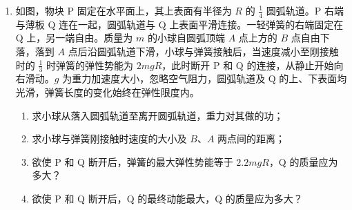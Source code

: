 \documentclass[\gkver]{gaokaozhenti}
\begin{document}
\begin{enumerate}
{$C_{2} = \alpha \frac{S}{d_{2}} = \alpha \frac{S}{\eta d_{1}}$

因为按压不改变电荷量 $Q$，所以按压后电压

$U_{2} = \frac{Q}{C_{2}} = \frac{Q \eta d_{1}}{\alpha S}$

所以有 $\frac{U_{2}}{U_{1}} = \eta$

即按压后极板间的电压变为按压前的 $\eta$ 倍。

（2）对于平行板电容器，极板间的电场强度 $E = \frac{U}{d}$；

设按压前电压为 $U$，极板间距离为 $d_{1}$，则电场强度

$E_{1} = \frac{U}{d_{1}}$

按压后极板间距离变为 $d_{2} = \eta d_{1}$，且电压不变仍为 $U$，此时电场强度

$E_{2} = \frac{U}{d_{2}} = \frac{U}{\eta d_{1}}$

所以有 $\frac{E_{2}}{E_{1}} = \frac{1}{\eta}$

按压后极板间的电场强度大小变为按压前的 $\frac{1}{\eta}$ 倍。
}

\item
如图，物块 P 固定在水平面上，其上表面有半径为 $R$ 的 $\frac{1}{4}$ 圆弧轨道。P 右端与薄板 Q 连在一起，圆弧轨道与 Q 上表面平滑连接。一轻弹簧的右端固定在 Q 上，另一端自由。质量为 $m$ 的小球自圆弧顶端 $A$ 点上方的 $B$ 点自由下落，落到 $A$ 点后沿圆弧轨道下滑，小球与弹簧接触后，当速度减小至刚接触时的 $\frac{1}{3}$ 时弹簧的弹性势能为 $2mgR$，此时断开 P 和 Q 的连接，从静止开始向右滑动。$g$ 为重力加速度大小，忽略空气阻力，圆弧轨道及 Q 的上、下表面均光滑，弹簧长度的变化始终在弹性限度内。
\begin{enumerate}
	\item
	求小球从落入圆弧轨道至离开圆弧轨道，重力对其做的功；
	\item
	求小球与弹簧刚接触时速度的大小及 $B$、$A$ 两点间的距离；
	\item
	欲使 P 和 Q 断开后，弹簧的最大弹性势能等于 $2.2mgR$，Q 的质量应为多大？
	\item
	欲使 P 和 Q 断开后，Q 的最终动能最大，Q 的质量应为多大？
\end{enumerate}


\end{enumerate}
\end{document}
